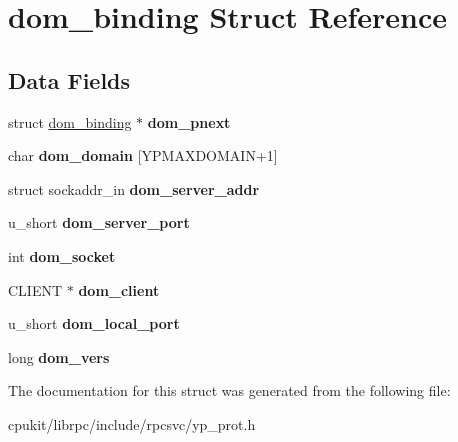 \hypertarget{structdom__binding}{}\section{dom\+\_\+binding Struct Reference}
\label{structdom__binding}
\subsection*{Data Fields}
\begin{DoxyCompactItemize}
\item 
\mbox{\label{structdom__binding_a5b2774a962a96744d4cfe44e982d1848}} 
struct \mbox{\hyperlink{structdom__binding}{dom\+\_\+binding}} $\ast$ {\bfseries dom\+\_\+pnext}
\item 
\mbox{\label{structdom__binding_abff01441b1df942cc70bc01ba32152af}} 
char {\bfseries dom\+\_\+domain} \mbox{[}Y\+P\+M\+A\+X\+D\+O\+M\+A\+IN+1\mbox{]}
\item 
\mbox{\label{structdom__binding_a1f8abd333bb2590af7d816d05d1b2c51}} 
struct sockaddr\+\_\+in {\bfseries dom\+\_\+server\+\_\+addr}
\item 
\mbox{\label{structdom__binding_a46971cbea8d1d73440a3e5cd24a3d638}} 
u\+\_\+short {\bfseries dom\+\_\+server\+\_\+port}
\item 
\mbox{\label{structdom__binding_abbb1b94f851f96907ab942e17780437f}} 
int {\bfseries dom\+\_\+socket}
\item 
\mbox{\label{structdom__binding_ac5f4086da1c24d37a0ebeb4ee5871ae0}} 
C\+L\+I\+E\+NT $\ast$ {\bfseries dom\+\_\+client}
\item 
\mbox{\label{structdom__binding_a7645c1f04aadd18813fd987ed2ef92ea}} 
u\+\_\+short {\bfseries dom\+\_\+local\+\_\+port}
\item 
\mbox{\label{structdom__binding_a3e16481b0e0d497cb389974d5e743b82}} 
long {\bfseries dom\+\_\+vers}
\end{DoxyCompactItemize}


The documentation for this struct was generated from the following file\+:\begin{DoxyCompactItemize}
\item 
cpukit/librpc/include/rpcsvc/yp\+\_\+prot.\+h\end{DoxyCompactItemize}
